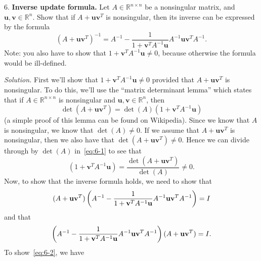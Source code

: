 \documentclass{article}
\def\*#1{\mathbf{#1}}
\newcommand{\R}{\mathbb{R}}
\begin{document}
\newpage

6. \textbf{Inverse update formula.}
Let $A \in \R^{n \times n}$ be a nonsingular matrix, and $\*u, \*v \in \R^n$.
Show that if $A + \*u \*v^T$ is nonsingular, then its inverse can be expressed
by the formula
%
\begin{equation*}
    (A + \*u \*v^T)^{-1} = A^{-1} - \frac{1}{1 + \*v^T A^{-1} \*u} A^{-1} \*u \*v^T A^{-1}.
\end{equation*}
%
Note: you also have to show that $1 + \*v^T A^{-1} \*u \neq 0$, because otherwise the formula
would be ill-defined.

\textit{Solution.}
First we'll show that $1 + \*v^T A^{-1} \*u \neq 0$ provided that
$A + \*u \*v^T$ is nonsingular. To do this, we'll use the
``matrix determinant lemma'' which states that if $A \in \R^{n \times n}$
is nonsingular and $\*u, \*v \in \R^n$, then
%
\begin{equation}
    \det(A + \*u \*v^T) = \det(A) (1 + \*v^T A^{-1} \*u)
    \label{eq:6-1}
\end{equation}
%
(a simple proof of this lemma can be found on Wikipedia). Since
we know that $A$ is nonsingular, we know that $\det(A) \neq 0$.
If we assume that $A + \*u \*v^T$ is nonsingular, then we also
have that $\det(A + \*u \*v^T) \neq 0$. Hence we can divide through by
$\det(A)$ in~\eqref{eq:6-1} to see that
%
\begin{equation*}
    (1 + \*v^T A^{-1} \*u) = \frac{\det(A + \*u \*v^T)}{\det(A)} \neq 0
    .
\end{equation*}
%
Now, to show that the inverse formula holds, we need to show that
%
\begin{equation}
    (A + \*u \*v^T) \del{A^{-1} - \frac{1}{1 + \*v^T A^{-1} \*u} A^{-1} \*u \*v^T A^{-1}} = I
    \label{eq:6-2}
\end{equation}
%
and that
%
\begin{equation}
    \del{A^{-1} - \frac{1}{1 + \*v^T A^{-1} \*u} A^{-1} \*u \*v^T A^{-1}} (A + \*u \*v^T) = I
    \label{eq:6-3}
    .
\end{equation}
%
To show~\eqref{eq:6-2}, we have
%
\end{document}
